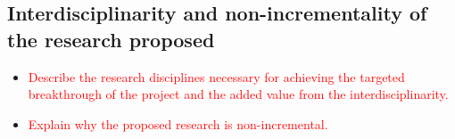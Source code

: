 \documentclass[12pt, a4paper]{article} %
\begin{document}

\subsection{Interdisciplinarity and non-incrementality of the research
  proposed}

\begin{itemize}
\item \textcolor{red}{Describe the research disciplines necessary for
    achieving the targeted breakthrough of the project and the added
    value from the interdisciplinarity.}
\item \textcolor{red}{Explain why the proposed research is
    non-incremental.}
  \end{itemize}
\end{document}
